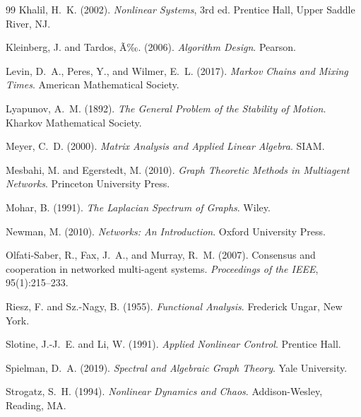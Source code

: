 ﻿\documentclass[12pt, a4paper]{article}
\theoremstyle{definition}
\theoremstyle{remark}
\begin{document}
\begin{thebibliography}{99}
	Khalil, H.~K. (2002).
	\newblock \textit{Nonlinear Systems}, 3rd ed.
	\newblock Prentice Hall, Upper Saddle River, NJ.
	
	Kleinberg, J. and Tardos, Ã‰. (2006).
	\newblock \textit{Algorithm Design}.
	\newblock Pearson.
	
	Levin, D.~A., Peres, Y., and Wilmer, E.~L. (2017).
	\newblock \textit{Markov Chains and Mixing Times}.
	\newblock American Mathematical Society.
	
	Lyapunov, A.~M. (1892).
	\newblock \textit{The General Problem of the Stability of Motion}.
	\newblock Kharkov Mathematical Society.
	
	Meyer, C.~D. (2000).
	\newblock \textit{Matrix Analysis and Applied Linear Algebra}.
	\newblock SIAM.
	
	Mesbahi, M. and Egerstedt, M. (2010).
	\newblock \textit{Graph Theoretic Methods in Multiagent Networks}.
	\newblock Princeton University Press.
	
	Mohar, B. (1991).
	\newblock \textit{The Laplacian Spectrum of Graphs}.
	\newblock Wiley.
	
	Newman, M. (2010).
	\newblock \textit{Networks: An Introduction}.
	\newblock Oxford University Press.
	
	Olfati-Saber, R., Fax, J.~A., and Murray, R.~M. (2007).
	\newblock Consensus and cooperation in networked multi-agent systems.
	\newblock \textit{Proceedings of the IEEE}, 95(1):215--233.
	
	Riesz, F. and Sz.-Nagy, B. (1955).
	\newblock \textit{Functional Analysis}.
	\newblock Frederick Ungar, New York.
	
	Slotine, J.-J.~E. and Li, W. (1991).
	\newblock \textit{Applied Nonlinear Control}.
	\newblock Prentice Hall.
	
	Spielman, D.~A. (2019).
	\newblock \textit{Spectral and Algebraic Graph Theory}.
	\newblock Yale University.
	
	Strogatz, S.~H. (1994).
	\newblock \textit{Nonlinear Dynamics and Chaos}.
	\newblock Addison-Wesley, Reading, MA.
	

\end{thebibliography}
\end{document}
